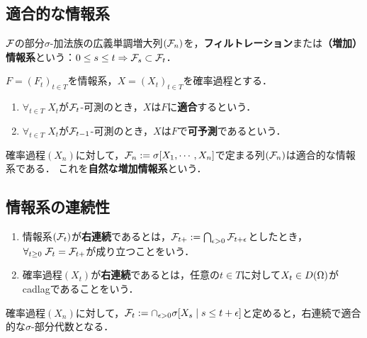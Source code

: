 \documentclass[uplatex,dvipdfmx]{jsreport}
\begin{document}
\subsection{適合的な情報系}

\begin{definition}
    $\mathcal{F}$の部分$\sigma$-加法族の広義単調増大列$(\mathcal{F}_n)$を，\textbf{フィルトレーション}または\textbf{（増加）情報系}という：$0\le s\le t\Rightarrow \mathcal{F}_s\subset\mathcal{F}_t$．
\end{definition}

\begin{definition}
    $F=(F_t)_{t\in T}$を情報系，$X=(X_t)_{t\in T}$を確率過程とする．
    \begin{enumerate}
        \item $\forall_{t\in T}\;X_t$が$\mathcal{F}_t$-可測のとき，$X$は$F$に\textbf{適合}するという．
        \item $\forall_{t\in T}\;X_t$が$\mathcal{F}_{t-1}$-可測のとき，$X$は$F$で\textbf{可予測}であるという．
    \end{enumerate}
\end{definition}

\begin{example}
    確率過程$(X_n)$に対して，$\mathcal{F}_n:=\sigma[X_1,\cdots,X_n]$で定まる列$(\mathcal{F}_n)$は適合的な情報系である．
    これを\textbf{自然な増加情報系}という．
\end{example}

\subsection{情報系の連続性}

\begin{definition}\mbox{}
    \begin{enumerate}
        \item 情報系$(\mathcal{F}_t)$が\textbf{右連続}であるとは，$\mathcal{F}_{t+}:=\bigcap_{\epsilon>0}\mathcal{F}_{t+\epsilon}$としたとき，$\forall_{t\ge0}\;\mathcal{F}_t=\mathcal{F}_{t+}$が成り立つことをいう．
        \item 確率過程$(X_t)$が\textbf{右連続}であるとは，任意の$t\in T$に対して$X_t\in D(\Omega)$がcadlagであることをいう．
    \end{enumerate}
\end{definition}

\begin{example}
    確率過程$(X_n)$に対して，$\mathcal{F}_t:=\cap_{\epsilon>0}\sigma[X_s\mid s\le t+\epsilon]$と定めると，右連続で適合的な$\sigma$-部分代数となる．
\end{example}
\end{document}
